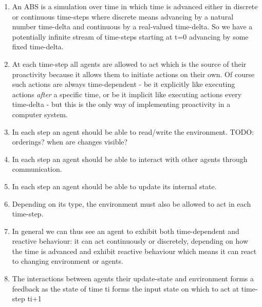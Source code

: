 \begin{enumerate}
	\item An ABS is a simulation over time in which time is advanced either in discrete or continuous time-steps where discrete means advancing by a natural number time-delta and continuous by a real-valued time-delta. So we have a potentially infinite stream of time-steps starting at t=0 advancing by some fixed time-delta.
	\item At each time-step all agents are allowed to act which is the source of their proactivity because it allows them to initiate actions on their own. Of course such actions are always time-dependent - be it explicitly like executing actions \textit{after} a specific time, or be it implicit like executing actions every time-delta - but this is the only way of implementing proactivity in a computer system.
	\item In each step an agent should be able to read/write the environment. TODO: orderings? when are changes visible?
	\item In each step an agent should be able to interact with other agents through communication. 
	\item In each step an agent should be able to update its internal state.
	\item Depending on its type, the environment must also be allowed to act in each time-step.
	\item In general we can thus see an agent to exhibit both time-dependent and reactive behaviour: it can act continuously or discretely, depending on how the time is advanced and exhibit reactive behaviour which means it can react to changing environment or agents.
	\item The interactions between agents their update-state and environment forms a feedback as the state of time ti forms the input state on which to act at time-step ti+1
\end{enumerate}